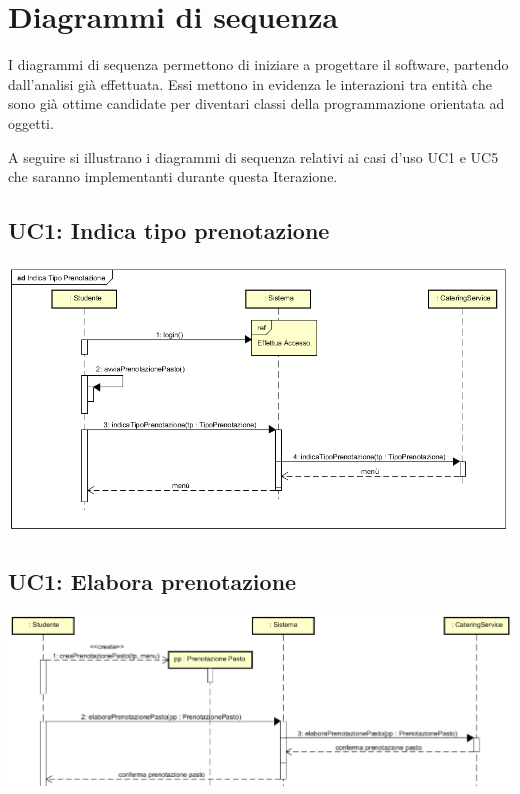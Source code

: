 \documentclass[12pt]{report}
\begin{document}
	
	
	\newpage
	
	
	\section{Diagrammi di sequenza}
	
	I diagrammi di sequenza permettono di iniziare a progettare il software, partendo dall'analisi già effettuata. Essi mettono in evidenza le interazioni tra entità che sono già ottime candidate per diventari classi della programmazione orientata ad oggetti.
	
	A seguire si illustrano i diagrammi di sequenza relativi ai casi d'uso UC1 e UC5 che saranno implementanti durante questa Iterazione.
	
	\subsection{UC1: Indica tipo prenotazione}
	\begin{center}
		\includegraphics[scale=0.8]{./images/IndicaTipoPrenotazione.png}
	\end{center}

	\subsection{UC1: Elabora prenotazione}
	\begin{center}
		\includegraphics[scale=0.8]{./images/ElaboraPrenotazione.png}
	\end{center}
	
\end{document}
